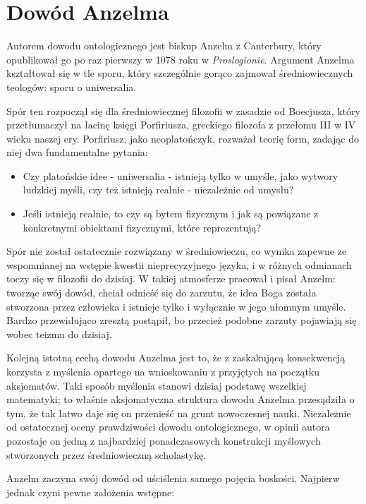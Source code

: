 \documentclass{article}
\begin{document}
\section{Dowód Anzelma} \label{sec:anzelm}

Autorem dowodu ontologicznego jest biskup Anzelm z Canterbury, który opublikował go po raz pierwszy w 1078 roku w \emph{Proslogionie}. Argument Anzelma kształtował się w tle sporu, który szczególnie gorąco zajmował średniowiecznych teologów: sporu o uniwersalia. 

Spór ten rozpoczął się dla średniowiecznej filozofii w zasadzie od Boecjusza, który przetłumaczył na łacinę księgi Porfiriusza, greckiego filozofa z przełomu III w IV wieku naszej ery. Porfiriusz, jako neoplatończyk, rozważał teorię form, zadając do niej dwa fundamentalne pytania:
\begin{itemize}
	\item Czy platońskie idee - uniwersalia - istnieją tylko w umyśle, jako wytwory ludzkiej myśli, czy też istnieją realnie - niezależnie od umysłu?
	\item Jeśli istnieją realnie, to czy są bytem fizycznym i jak są powiązane z konkretnymi obiektami fizycznymi, które reprezentują?
\end{itemize}

Spór nie został ostatecznie rozwiązany w średniowieczu, co wynika zapewne ze wspomnianej na wstępie kwestii nieprecyzyjnego języka, i w różnych odmianach toczy się w filozofii do dzisiaj. W takiej atmosferze pracował i pisał Anzelm: tworząc swój dowód, chciał odnieść się do zarzutu, że idea Boga została stworzona przez człowieka i istnieje tylko i wyłącznie w jego ułomnym umyśle. Bardzo przewidująco zresztą postąpił, bo przecież podobne zarzuty pojawiają się wobec teizmu do dzisiaj. 

Kolejną istotną cechą dowodu Anzelma jest to, że z zaskakującą konsekwencją korzysta z myślenia opartego na wnioskowaniu z przyjętych na początku aksjomatów. Taki sposób myślenia stanowi dzisiaj podstawę wszelkiej matematyki; to właśnie aksjomatyczna struktura dowodu Anzelma przesądziła o tym, że tak łatwo daje się on przenieść na grunt nowoczesnej nauki. Niezależnie od ostatecznej oceny prawdziwości dowodu ontologicznego, w opinii autora pozostaje on jedną z najbardziej ponadczasowych konstrukcji myślowych stworzonych przez średniowieczną scholastykę. 

Anzelm zaczyna swój dowód od uściślenia samego pojęcia boskości. Najpierw jednak czyni pewne założenia wstępne: 
\end{document}
